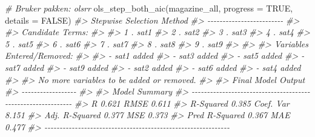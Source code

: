 \documentclass[
]{article}
\newenvironment{Shaded}{\begin{snugshade}}{\end{snugshade}}
\newcommand{\AttributeTok}[1]{\textcolor[rgb]{0.77,0.63,0.00}{#1}}
\newcommand{\CommentTok}[1]{\textcolor[rgb]{0.56,0.35,0.01}{\textit{#1}}}
\newcommand{\ConstantTok}[1]{\textcolor[rgb]{0.00,0.00,0.00}{#1}}
\newcommand{\FunctionTok}[1]{\textcolor[rgb]{0.00,0.00,0.00}{#1}}
\newcommand{\NormalTok}[1]{#1}
\begin{document}
\begin{Shaded}
\begin{Highlighting}[]
\CommentTok{\# Bruker pakken: olsrr}
\FunctionTok{ols\_step\_both\_aic}\NormalTok{(magazine\_all, }\AttributeTok{progress =} \ConstantTok{TRUE}\NormalTok{, }\AttributeTok{details =} \ConstantTok{FALSE}\NormalTok{)}
\CommentTok{\#\textgreater{} Stepwise Selection Method }
\CommentTok{\#\textgreater{} {-}{-}{-}{-}{-}{-}{-}{-}{-}{-}{-}{-}{-}{-}{-}{-}{-}{-}{-}{-}{-}{-}{-}{-}{-}}
\CommentTok{\#\textgreater{} }
\CommentTok{\#\textgreater{} Candidate Terms: }
\CommentTok{\#\textgreater{} }
\CommentTok{\#\textgreater{} 1 . sat1 }
\CommentTok{\#\textgreater{} 2 . sat2 }
\CommentTok{\#\textgreater{} 3 . sat3 }
\CommentTok{\#\textgreater{} 4 . sat4 }
\CommentTok{\#\textgreater{} 5 . sat5 }
\CommentTok{\#\textgreater{} 6 . sat6 }
\CommentTok{\#\textgreater{} 7 . sat7 }
\CommentTok{\#\textgreater{} 8 . sat8 }
\CommentTok{\#\textgreater{} 9 . sat9 }
\CommentTok{\#\textgreater{} }
\CommentTok{\#\textgreater{} }
\CommentTok{\#\textgreater{} Variables Entered/Removed: }
\CommentTok{\#\textgreater{} }
\CommentTok{\#\textgreater{} {-} sat1 added }
\CommentTok{\#\textgreater{} {-} sat3 added }
\CommentTok{\#\textgreater{} {-} sat5 added }
\CommentTok{\#\textgreater{} {-} sat7 added }
\CommentTok{\#\textgreater{} {-} sat9 added }
\CommentTok{\#\textgreater{} {-} sat2 added }
\CommentTok{\#\textgreater{} {-} sat6 added }
\CommentTok{\#\textgreater{} {-} sat4 added }
\CommentTok{\#\textgreater{} }
\CommentTok{\#\textgreater{} No more variables to be added or removed.}
\CommentTok{\#\textgreater{} }
\CommentTok{\#\textgreater{} Final Model Output }
\CommentTok{\#\textgreater{} {-}{-}{-}{-}{-}{-}{-}{-}{-}{-}{-}{-}{-}{-}{-}{-}{-}{-}}
\CommentTok{\#\textgreater{} }
\CommentTok{\#\textgreater{}                         Model Summary                         }
\CommentTok{\#\textgreater{} {-}{-}{-}{-}{-}{-}{-}{-}{-}{-}{-}{-}{-}{-}{-}{-}{-}{-}{-}{-}{-}{-}{-}{-}{-}{-}{-}{-}{-}{-}{-}{-}{-}{-}{-}{-}{-}{-}{-}{-}{-}{-}{-}{-}{-}{-}{-}{-}{-}{-}{-}{-}{-}{-}{-}{-}{-}{-}{-}{-}{-}}
\CommentTok{\#\textgreater{} R                       0.621       RMSE               0.611 }
\CommentTok{\#\textgreater{} R{-}Squared               0.385       Coef. Var          8.151 }
\CommentTok{\#\textgreater{} Adj. R{-}Squared          0.377       MSE                0.373 }
\CommentTok{\#\textgreater{} Pred R{-}Squared          0.367       MAE                0.477 }
\CommentTok{\#\textgreater{} {-}{-}{-}{-}{-}{-}{-}{-}{-}{-}{-}{-}{-}{-}{-}{-}{-}{-}{-}{-}{-}{-}{-}{-}{-}{-}{-}{-}{-}{-}{-}{-}{-}{-}{-}{-}{-}{-}{-}{-}{-}{-}{-}{-}{-}{-}{-}{-}{-}{-}{-}{-}{-}{-}{-}{-}{-}{-}{-}{-}{-}}

\end{Highlighting}
\end{Shaded}
\end{document}
